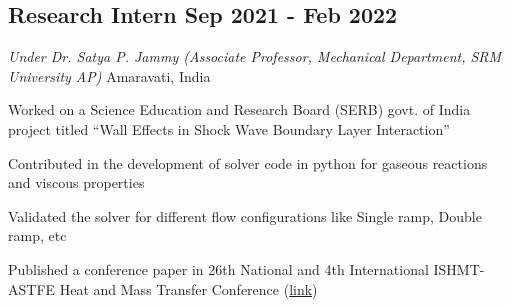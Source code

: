 \subsection{{Research Intern \hfill  Sep 2021 - Feb 2022}}
{\textit{Under Dr. Satya P. Jammy (Associate Professor, Mechanical Department, SRM University AP)} \hfill Amaravati, India}
\begin{zitemize}
\item {Worked on a Science Education and Research Board (SERB) govt. of India project titled ``Wall Effects in Shock Wave Boundary Layer Interaction''}
\item {Contributed in the development of solver code in python for gaseous reactions and viscous properties}
\item {Validated the solver for different flow configurations like Single ramp, Double ramp, etc}
\item {Published a conference paper in 26th National and 4th International ISHMT-ASTFE Heat and Mass Transfer Conference (\href{https://www.dl.begellhouse.com/references/486d924a7e5ad8c3,393f7ffc7879d8ca,2aa0e4f13f8adbd7.html}{link})}
\end{zitemize}



